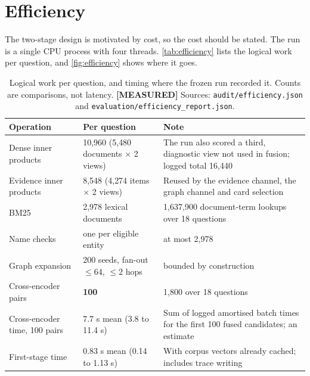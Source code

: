 \documentclass[11pt,a4paper]{article}
\newcommand{\cref}[1]{\autoref{#1}}
\newcommand{\Cref}[1]{\autoref{#1}}
\theoremstyle{remark}
\newcommand{\code}[1]{\texttt{\small #1}}
\newcommand{\vtag}[2]{{\sffamily\scriptsize\bfseries\textcolor{#1}{[#2]}}}
\newcommand{\Mtag}{\vtag{measgreen}{MEASURED}}
\begin{document}
\section{Efficiency}
\label{sec:efficiency}

The two-stage design is motivated by cost, so the cost should be stated. The run is a
single CPU process with four threads. \Cref{tab:efficiency} lists the logical work per
question, and \cref{fig:efficiency} shows where it goes.

\begin{table}[!htbp]
\centering
\caption[Logical work and timing]{Logical work per question, and timing where the frozen run recorded it. Counts
are comparisons, not latency. \Mtag{} Sources: \code{audit/efficiency.json} and
\code{evaluation/efficiency\_report.json}.}
\label{tab:efficiency}
\small
\begin{tabularx}{\linewidth}{p{4.3cm}p{4.6cm}X}
\toprule
Operation & Per question & Note\\
\midrule
Dense inner products & 10{,}960 (5{,}480 documents $\times$ 2 views) & The run also scored a
  third, diagnostic view not used in fusion; logged total 16{,}440\\
Evidence inner products & 8{,}548 (4{,}274 items $\times$ 2 views) & Reused by the evidence
  channel, the graph channel and card selection\\
BM25 & 2{,}978 lexical documents & 1{,}637{,}900 document-term lookups over 18 questions\\
Name checks & one per eligible entity & at most 2{,}978\\
Graph expansion & 200 seeds, fan-out $\le64$, $\le2$ hops & bounded by construction\\
\midrule
Cross-encoder pairs & \textbf{100} & 1{,}800 over 18 questions\\
Cross-encoder time, 100 pairs & 7.7 s mean (3.8 to 11.4 s) & Sum of logged amortised batch
  times for the first 100 fused candidates; an estimate\\
First-stage time & 0.83 s mean (0.14 to 1.13 s) & With corpus vectors already cached;
  includes trace writing\\
\bottomrule
\end{tabularx}
\end{table}
\end{document}
